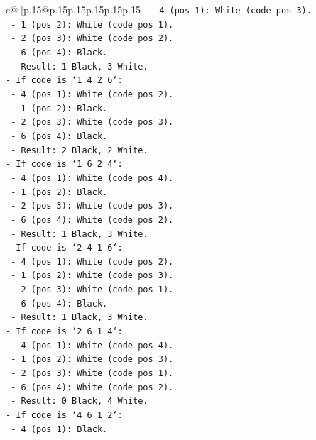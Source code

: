 \documentclass{article}
\begin{document}
{\begin{supertabular}{c@{$\;$}|p{.15\linewidth}@{}p{.15\linewidth}p{.15\linewidth}p{.15\linewidth}p{.15\linewidth}p{.15\linewidth}}
{{{\texttt{  {-} 4 (pos 1): White (code pos 3).} \\
\texttt{  {-} 1 (pos 2): White (code pos 1).} \\
\texttt{  {-} 2 (pos 3): White (code pos 2).} \\
\texttt{  {-} 6 (pos 4): Black.} \\
\texttt{  {-} Result: 1 Black, 3 White.} \\
\texttt{{-} If code is `1 4 2 6`:} \\
\texttt{  {-} 4 (pos 1): White (code pos 2).} \\
\texttt{  {-} 1 (pos 2): Black.} \\
\texttt{  {-} 2 (pos 3): White (code pos 3).} \\
\texttt{  {-} 6 (pos 4): Black.} \\
\texttt{  {-} Result: 2 Black, 2 White.} \\
\texttt{{-} If code is `1 6 2 4`:} \\
\texttt{  {-} 4 (pos 1): White (code pos 4).} \\
\texttt{  {-} 1 (pos 2): Black.} \\
\texttt{  {-} 2 (pos 3): White (code pos 3).} \\
\texttt{  {-} 6 (pos 4): White (code pos 2).} \\
\texttt{  {-} Result: 1 Black, 3 White.} \\
\texttt{{-} If code is `2 4 1 6`:} \\
\texttt{  {-} 4 (pos 1): White (code pos 2).} \\
\texttt{  {-} 1 (pos 2): White (code pos 3).} \\
\texttt{  {-} 2 (pos 3): White (code pos 1).} \\
\texttt{  {-} 6 (pos 4): Black.} \\
\texttt{  {-} Result: 1 Black, 3 White.} \\
\texttt{{-} If code is `2 6 1 4`:} \\
\texttt{  {-} 4 (pos 1): White (code pos 4).} \\
\texttt{  {-} 1 (pos 2): White (code pos 3).} \\
\texttt{  {-} 2 (pos 3): White (code pos 1).} \\
\texttt{  {-} 6 (pos 4): White (code pos 2).} \\
\texttt{  {-} Result: 0 Black, 4 White.} \\
\texttt{{-} If code is `4 6 1 2`:} \\
\texttt{  {-} 4 (pos 1): Black.} \\
}}}
\end{supertabular}}
\end{document}

